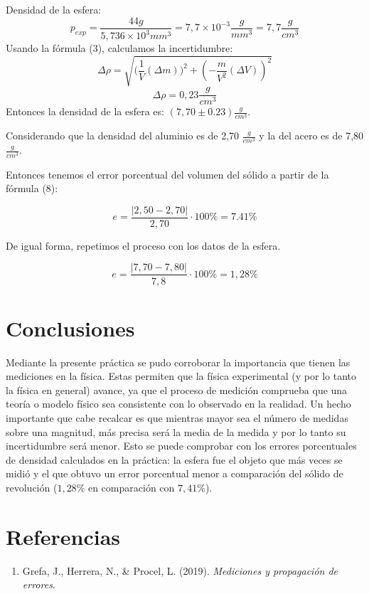 \documentclass[a4paper]{article}
\begin{document}
Densidad de la esfera:
\[p_{exp}=\frac{44g}{5,736 \times 10^3 mm^3}= 7,7 \times 10^{-3} \frac{g}{mm^3}=7,7\frac{g}{cm^3}\] 
Usando la fórmula (3), calculamos la incertidumbre:
\[\Delta \rho=\sqrt{({\frac{1}{V}(\Delta{m}))^2+  (-\frac{m}{V^2} (\Delta{V}))^2}}\]
\[\Delta \rho=0,23 \frac{g}{cm^3}\]
Entonces la densidad de la esfera es: $(7,70\pm0.23) \frac{g}{cm^3}$.

Considerando que la densidad del aluminio es de 2,70 $\frac{g}{cm^3}$ y la del acero es de 7,80 $\frac{g}{cm^3}$.

Entonces tenemos el error porcentual del volumen del sólido a partir de la fórmula (8):

\[e=\frac{|2,50 - 2,70|}{2,70}\cdot 100 \%=7.41\%\]

De igual forma, repetimos el proceso con los datos de la esfera.

\[e=\frac{|7,70 - 7,80|}{7,8}\cdot 100 \%=1,28\%\]

\section{Conclusiones}
Mediante la presente práctica se pudo corroborar la importancia que tienen las mediciones en la física. Estas permiten que la física experimental (y por lo tanto la física en general) avance, ya que el proceso de medición comprueba que una teoría o modelo físico sea consistente con lo observado en la realidad. Un hecho importante que cabe recalcar es que mientras mayor sea el número de medidas sobre una magnitud, más precisa será la media de la medida y por lo tanto su incertidumbre será menor. Esto se puede comprobar con los errores porcentuales de densidad calculados en la práctica: la esfera fue el objeto que más veces se midió y el que obtuvo un error porcentual menor a comparación del sólido de revolución ($1,28\%$ en comparación con  $7,41\%$). 


\section{Referencias}
\begin{enumerate}
    \item Grefa, J., Herrera, N., \& Procel, L. (2019). \textit{Mediciones y propagación de errores}.
\end{enumerate}
\end{document}

